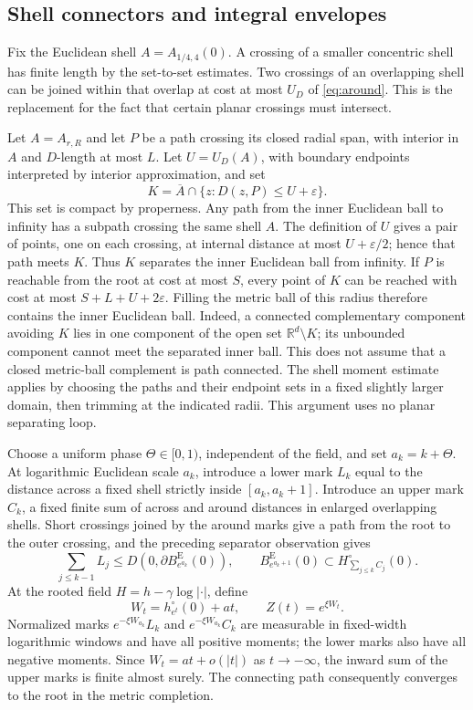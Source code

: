 \documentclass[11pt,reqno]{amsart}
\theoremstyle{plain}
\theoremstyle{definition}
\theoremstyle{remark}
\newcommand{\R}{\mathbb R}
\newcommand{\1}{\mathbf{1}}
\newcommand{\Be}{B^{\mathrm E}}
\begin{document}
\subsection{Shell connectors and integral envelopes}\label{subsec:connectors}
Fix the Euclidean shell $A=A_{1/4,4}(0)$. A crossing of a smaller concentric shell has finite length by the set-to-set estimates. Two crossings of an overlapping shell can be joined within that overlap at cost at most $U_D$ of \eqref{eq:around}. This is the replacement for the fact that certain planar crossings must intersect.

Let $A=A_{r,R}$ and let $P$ be a path crossing its closed radial span, with interior in $A$ and $D$-length at most $L$. Let $U=U_D(A)$, with boundary endpoints interpreted by interior approximation, and set
\[
K=\overline A\cap\{z:D(z,P)\le U+\varepsilon\}.
\]
This set is compact by properness. Any path from the inner Euclidean ball to infinity has a subpath crossing the same shell $A$. The definition of $U$ gives a pair of points, one on each crossing, at internal distance at most $U+\varepsilon/2$; hence that path meets $K$. Thus $K$ separates the inner Euclidean ball from infinity. If $P$ is reachable from the root at cost at most $S$, every point of $K$ can be reached with cost at most $S+L+U+2\varepsilon$. Filling the metric ball of this radius therefore contains the inner Euclidean ball. Indeed, a connected complementary component avoiding $K$ lies in one component of the open set $\R^d\setminus K$; its unbounded component cannot meet the separated inner ball. This does not assume that a closed metric-ball complement is path connected. The shell moment estimate applies by choosing the paths and their endpoint sets in a fixed slightly larger domain, then trimming at the indicated radii. This argument uses no planar separating loop.

Choose a uniform phase $\Theta\in[0,1)$, independent of the field, and set $a_k=k+\Theta$. At logarithmic Euclidean scale $a_k$, introduce a lower mark $L_k$ equal to the distance across a fixed shell strictly inside $[a_k,a_k+1]$. Introduce an upper mark $C_k$, a fixed finite sum of across and around distances in enlarged overlapping shells. Short crossings joined by the around marks give a path from the root to the outer crossing, and the preceding separator observation gives
\begin{equation}\label{eq:discrete-envelopes}
\sum_{j\le k-1}L_j\le D(0,\partial\Be_{e^{a_k}}(0)),\qquad
\Be_{e^{a_k+1}}(0)\subset H_{\sum_{j\le k}C_j}^\circ(0).
\end{equation}
At the rooted field $H=h-\gamma\log|\cdot|$, define
\begin{equation}\label{eq:WZ}
W_t=h_{e^t}^\circ(0)+at,\qquad Z(t)=e^{\xi W_t}.
\end{equation}
Normalized marks $e^{-\xi W_{a_k}}L_k$ and $e^{-\xi W_{a_k}}C_k$ are measurable in fixed-width logarithmic windows and have all positive moments; the lower marks also have all negative moments. Since $W_t=at+o(|t|)$ as $t\to-\infty$, the inward sum of the upper marks is finite almost surely. The connecting path consequently converges to the root in the metric completion.
\end{document}
